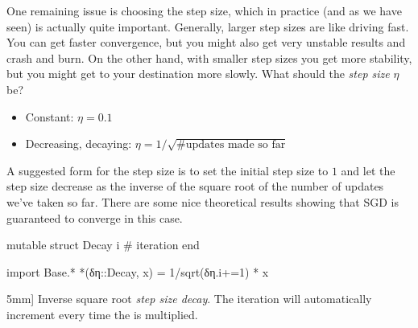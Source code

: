 One remaining issue is choosing the step size, which in practice (and as we have seen) is actually quite important.
Generally, larger step sizes are like driving fast.  You can get faster convergence, but you might also get very unstable results and crash and burn.
On the other hand, with smaller step sizes you get more stability, but you might get to your destination more slowly.
What should the \textit{step size} $\eta$ be?
\begin{figure}
\end{figure}
\begin{itemize}
    \item Constant: $\eta = 0.1$
    \item Decreasing, decaying: $\eta = 1/\sqrt{\text{\# updates made so far}}$
\end{itemize}
% 
A suggested form for the step size is to set the initial step size to $1$ and let the step size decrease as the inverse of the square root of the number of updates we've taken so far.
There are some nice theoretical results showing that SGD is guaranteed to converge in this case.

\begin{algorithm}
\begin{juliaverbatim}
mutable struct Decay
    i # iteration
end

import Base.*
*(δη::Decay, x) = 1/sqrt(δη.i+=1) * x
\end{juliaverbatim}

\caption[][5mm]{
    \label{alg:step_size_decay}
    Inverse square root \textit{step size decay}. The iteration  will automatically increment every time the  is multiplied.
}
\end{algorithm}


